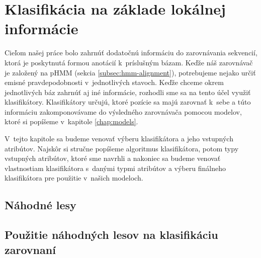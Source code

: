 \chapter[Klasifikácia]{Klasifikácia na základe lokálnej informácie}

Cieľom našej práce bolo zahrnúť dodatočnú informáciu do zarovnávania sekvencií, ktorá je poskytnutá formou anotácií k~príslušným bázam. Keďže náš zarovnávač je založený na pHMM (sekcia \ref{subsec:hmm-alignment}), potrebujeme nejako určiť emisné pravdepodobnosti v~jednotlivých stavoch. Keďže chceme okrem jednotlivých báz zahrnúť aj iné informácie, rozhodli sme sa na tento účel využiť klasifikátory. Klasifikátory určujú, ktoré pozície sa majú zarovnať k~sebe a túto informáciu zakomponovávame do výsledného zarovnávača pomocou modelov, ktoré si popíšeme v~kapitole \ref{chap:models}.

V~tejto kapitole sa budeme venovať výberu klasifikátora a jeho vstupných atribútov. Najskôr si stručne popíšeme algoritmus klasifikátora, potom typy vstupných atribútov, ktoré sme navrhli a nakoniec sa budeme venovať vlastnostiam klasifikátora s~danými typmi atribútov a výberu finálneho klasifikátora pre použitie v~našich modeloch.

\section{Náhodné lesy}


\section[Použitie náh. lesov v~zarovnaní]{Použitie náhodných lesov na klasifikáciu zarovnaní}
\label{sec:use-rf-alignment}


